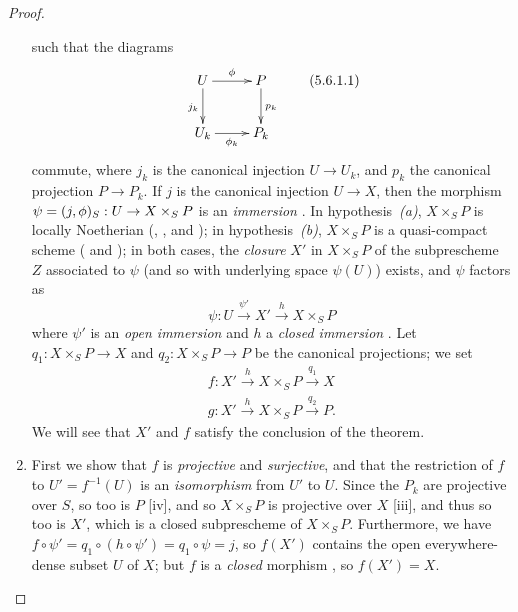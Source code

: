 \begin{proof}
\begin{enumerate}[label=(\Alph*)]
        such that the diagrams
        \begin{equation*}
        \label{2.5.6.1.1}
            \xymatrix{
                U \ar[r]^\vphi \ar[d]_{j_k}
                & P \ar[d]^{p_k}\\
                U_k\ar[r]_{\vphi_k}
                & P_k
            }\tag{5.6.1.1}
        \end{equation*}
        commute, where $j_k$ is the canonical injection $U\to U_k$, and $p_k$ the canonical projection $P\to P_k$.
        If $j$ is the canonical injection $U\to X$, then the morphism $\psi=(j,\vphi)_S:U\to X\times_S P$ is an \emph{immersion} .
        In hypothesis~\emph{(a)}, $X\times_S P$ is locally Noetherian (, , and );
        in hypothesis~\emph{(b)}, $X\times_S P$ is a quasi-compact scheme ( and );
        in both cases, the \emph{closure} $X'$ in $X\times_S P$ of the subprescheme $Z$ associated to $\psi$ (and so with underlying space $\psi(U)$) exists, and $\psi$ factors as
        \begin{equation*}
        \label{2.5.6.1.2}
            \psi:U\xrightarrow{\psi'}X'\xrightarrow{h}X\times_S P\tag{5.6.1.2}
        \end{equation*}
        where $\psi'$ is an \emph{open immersion} and $h$ a \emph{closed immersion} .
        Let $q_1:X\times_S P\to X$ and $q_2:X\times_S P\to P$ be the canonical projections; we set
        \begin{gather*}
            f:X'\xrightarrow{h}X\times_S P\xrightarrow{q_1}X\tag{5.6.1.3}\label{2.5.6.1.3}\\
            g:X'\xrightarrow{h}X\times_S P\xrightarrow{q_2}P.\tag{5.6.1.4}\label{2.5.6.1.4}
        \end{gather*}
        We will see that $X'$ and $f$ satisfy the conclusion of the theorem.
    \item First we show that $f$ is \emph{projective} and \emph{surjective}, and that the restriction of $f$ to $U'=f^{-1}(U)$ is an \emph{isomorphism} from $U'$ to $U$.
        Since the $P_k$ are projective over $S$, so too is $P$ [iv], and so $X\times_S P$ is projective over $X$ [iii], and thus so too is $X'$, which is a closed subprescheme of $X\times_S P$.
        Furthermore, we have $f\circ\psi' = q_1\circ(h\circ\psi') = q_1\circ\psi = j$, so $f(X')$ contains the open everywhere-dense subset $U$ of $X$;
        but $f$ is a \emph{closed} morphism , so $f(X')=X$.

\end{enumerate}
\end{proof}
